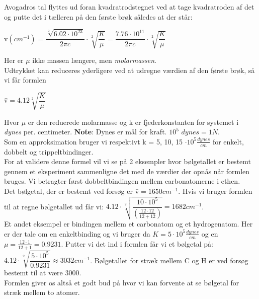 Avogadros tal flyttes ud foran kvadratrodstegnet ved at tage kvadratroden af det og putte det i tælleren på den første brøk således at der står:

\begin{center}
\={v}$(cm^{-1})=\dfrac{\sqrt[2]{6.02 \cdot 10^{23}}}{2 \pi c} \cdot \sqrt[2]{\dfrac{K}{\mu}} = \dfrac{7.76 \cdot 10^{11}}{2 \pi c} \cdot \sqrt[2]{\dfrac{K}{\mu}}$
\end{center}

Her er $\mu$ ikke massen længere, men \emph{molarmassen}.
\\

Udtrykket kan reduceres yderligere ved at udregne værdien af den  første brøk, så vi får formlen

\begin{center}
\={v}$=4.12 \sqrt[2]{\dfrac{K}{\mu}}$
\end{center}

Hvor $\mu$ er den reduerede molarmasse og k er fjederkonstanten for systemet i \emph{dynes} per. centimeter. \textbf{Note}: Dynes er mål for kraft. $10^5$  $dynes = 1N$.
\\

Som en approksimation bruger vi respektivt k = 5, 10, 15 $\cdot 10^5 \frac{dynes}{cm}$ for enkelt, dobbelt og trippeltbindinger.
\\

For at validere denne formel vil vi se på 2 eksempler hvor bølgetallet er bestemt gennem et eksperiment sammenligne det med de værdier der opnås når formlen bruges. Vi betragter først dobbeltbindingen mellem carbonatomerne i ethen.
\\

Det bølgetal, der er bestemt ved forsøg er \={v}$=1650cm^{-1}$. Hvis vi bruger formlen til at regne bølgetallet ud får vi: $4.12 \cdot \sqrt[2]{\dfrac{10 \cdot 10^5}{(\frac{12 \cdot 12}{12 +12})}} = 1682 cm^{-1}$. 
\\

Et andet eksempel er bindingen mellem et carbonatom og et hydrogenatom. Her er der tale om en enkeltbinding og vi bruger da $K=5 \cdot 10^5 \frac{dynes}{cm}$ og en $\mu = \frac{12 \cdot 1}{12 + 1} = 0.9231$. Putter vi det ind i formlen får vi et bølgetal på: $4.12 \cdot \sqrt[2]{\dfrac{5 \cdot 10^5}{0.9231}} \approx 3032 cm^{-1}$. Bølgetallet for stræk mellem C og H er ved forsøg bestemt til at være 3000. 
\\

Formlen giver os altså et godt bud på hvor vi kan forvente at se bølgetal for stræk mellem to atomer.
\\

